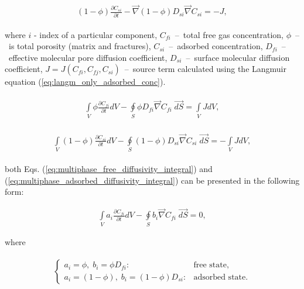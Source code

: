 \documentclass[a4paper,14pt,english]{extreport}
\begin{document}
\begin{eqnarray}
\begin{gathered}
\label{eq:multiphase_adsorbed_diffusivity_differential}
\left(1-\phi\right) \frac{\partial C_{si}}{\partial t}  - \vec{\nabla} \left(1-\phi\right) D_{si} \vec{\nabla}C_{si} = -J,
\end{gathered}
\end{eqnarray}

where $i$ - index of  a particular component, $C_{fi}$~--~total free gas concentration, $\phi$~--~is total porosity (matrix and fractures), $C_{si}$~--~adsorbed concentration, $D_{fi}$~--~effective molecular pore diffusion coefficient, $D_{si}$~--~surface molecular diffusion coefficient, $J=J\left(C_{fi}, C_{fj}, C_{si} \right)$~--~source term calculated using the Langmuir equation (\ref{eq:langm_only_adsorbed_conc}).

\begin{eqnarray}
\begin{gathered}
\label{eq:multiphase_free_diffusivity_integral}
\int \limits_{V} \phi \frac{\partial C_{fi}}{\partial t} dV  - \oint \limits_{S} \phi D_{fi} \vec{\nabla}C_{fi} \; \vec{dS} = \int \limits_{V} J dV,
\end{gathered}
\end{eqnarray}

\begin{eqnarray}
\begin{gathered}
\label{eq:multiphase_adsorbed_diffusivity_integral}
\int \limits_{V} \left(1-\phi\right) \frac{\partial C_{si}}{\partial t} dV - \oint \limits_{S} \left(1-\phi\right) D_{si} \vec{\nabla}C_{si} \; \vec{dS} = -\int \limits_{V}JdV,
\end{gathered}
\end{eqnarray}

both Eqs. (\ref{eq:multiphase_free_diffusivity_integral}) and (\ref{eq:multiphase_adsorbed_diffusivity_integral}) can be presented in the following form:

\begin{eqnarray}
\label{eq:multiphase_diffusivity_simplified_integral}
\int \limits_{V} a_{i} \frac{\partial C_{fi}}{\partial t} dV - \oint \limits_{S} b_{i} \vec{\nabla}C_{fi} \; \vec{dS} = 0,
\end{eqnarray}

where 

\begin{eqnarray}
\label{eq:multiphase_diffusivity_a_b_coeffs}
\begin{gathered}
\begin{cases}
a_{i} = \phi, \; b_{i} = \phi D_{fi}: &\text{free state},\\
a_{i} = \left(1-\phi\right), \; b_{i} = \left(1-\phi\right) D_{si}: &\text{adsorbed state}.
\end{cases}
\end{gathered}
\end{eqnarray}
\end{document}
